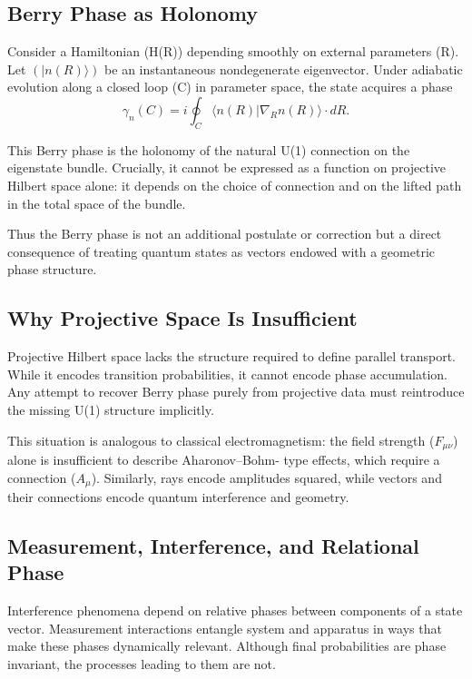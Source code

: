 \documentclass[11pt]{article}
\begin{document}
\subsection{Berry Phase as Holonomy}

Consider a Hamiltonian (H(R)) depending smoothly on external parameters
(R). Let $(|n(R)\rangle)$ be an instantaneous nondegenerate eigenvector.
Under adiabatic evolution along a closed loop (C) in parameter space, 
the state acquires a phase
\[
\gamma_n(C) = i \oint_C \langle n(R) | \nabla_R n(R) \rangle \cdot dR.
\]

This Berry phase is the holonomy of the natural U(1) connection on the
eigenstate bundle. Crucially, it cannot be expressed as a function on
projective Hilbert space alone: it depends on the choice of connection 
and on the lifted path in the total space of the bundle.

Thus the Berry phase is not an additional postulate or correction but a
direct consequence of treating quantum states as vectors endowed with a
geometric phase structure.

\subsection{Why Projective Space Is Insufficient}

Projective Hilbert space lacks the structure required to define parallel
transport. While it encodes transition probabilities, it cannot encode
phase accumulation. Any attempt to recover Berry phase purely from
projective data must reintroduce the missing U(1) structure implicitly.

This situation is analogous to classical electromagnetism: the field
strength ($F_{\mu\nu}$) alone is insufficient to describe Aharonov–Bohm-
type effects, which require a connection ($A_\mu$). Similarly, rays encode
amplitudes squared, while vectors and their connections encode quantum
interference and geometry.

\subsection{Measurement, Interference, and Relational Phase}

Interference phenomena depend on relative phases between components of a
state vector. Measurement interactions entangle system and apparatus in
ways that make these phases dynamically relevant. Although final
probabilities are phase invariant, the processes leading to them are not.
\end{document}
